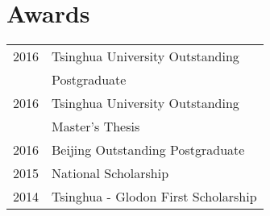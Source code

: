\documentclass[]{resume_en}
\begin{document}
\begin{minipage}[t]{0.33\textwidth}




\section{Awards} 
\setlength\tabcolsep{2pt}
\begin{tabular}{ll}
	2016 & Tsinghua University Outstanding \\
	& Postgraduate\\
	2016 & Tsinghua University Outstanding \\
	& Master's Thesis\\
	2016 & Beijing Outstanding Postgraduate\\
	2015 & National Scholarship\\
	2014 & Tsinghua - Glodon First Scholarship\\
\end{tabular}
\sectionsep


\end{minipage}
\end{document}
